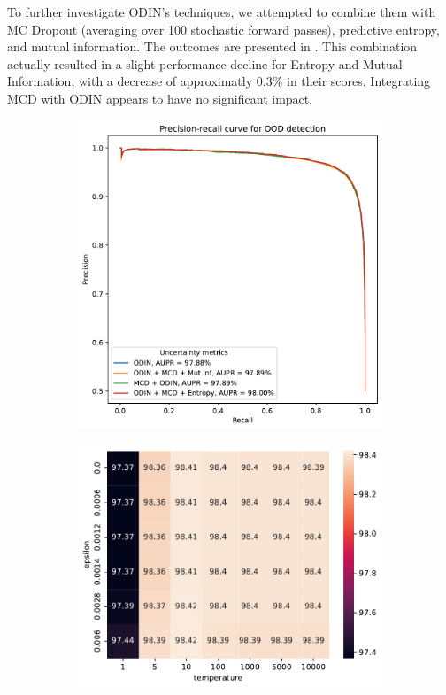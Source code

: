 To further investigate ODIN's techniques, we attempted to combine them with MC Dropout (averaging over 100 stochastic forward passes), predictive entropy, and mutual information. The outcomes are presented in . This combination actually resulted in a slight performance decline for Entropy and Mutual Information, with a decrease of approximatly $0.3\%$ in their scores. Integrating MCD with ODIN appears to have no significant impact.
\begin{figure}[H]
    \centering
    \begin{subfigure}{0.45\textwidth}
        \includegraphics[width=\textwidth]{OOD_aupr_combo.pdf}
        \caption{}
        \label{fig:OOD_aupr_combo}
    \end{subfigure}%
    \begin{subfigure}{0.45\textwidth}
        \includegraphics[width=\textwidth]{odin_grid_search.pdf}

\end{subfigure}
\end{figure}
